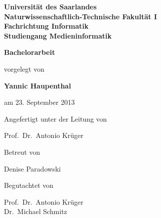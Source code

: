 \begin{titlepage}

	\vspace*{\fill}

	\begin{center}

	\large{\textbf{Universität des Saarlandes\\
	Naturwissenschaftlich\@-Technische Fakultät I\\
	Fachrichtung Informatik\\
	Studiengang Medieninformatik}}

	\vspace*{15ex}

	\large{\textbf{Bachelorarbeit}}

	\vspace*{5ex}

	{\Large{\textbf{\namefull}}}

	\vspace*{5ex}

	\large{vorgelegt von

	\textbf{Yannic Haupenthal}

	am 23. September 2013}

	\vspace*{25ex}

	\large{Angefertigt unter der Leitung von

	Prof.\ Dr.\ Antonio Krüger}

	\vspace*{3ex}
	
	\large{Betreut von

	Denise Paradowski}

	\vspace*{3ex}

	\large{Begutachtet von

	Prof.\ Dr.\ Antonio Krüger\\
	Dr.\ Michael Schmitz}

	\end{center}

	\vspace*{\fill}

\end{titlepage}